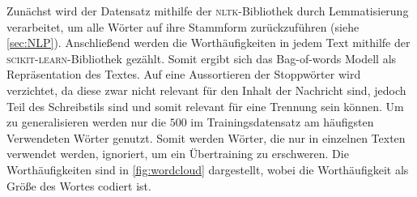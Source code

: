 Zunächst wird der Datensatz mithilfe der \textsc{nltk}-Bibliothek\cite{nltk} durch Lemmatisierung verarbeitet, um 
alle Wörter auf ihre Stammform zurückzuführen (siehe \autoref{sec:NLP}). 
Anschließend werden die Worthäufigkeiten in jedem Text mithilfe der \textsc{scikit-learn}-Bibliothek\cite{scikit-learn} 
gezählt. 
Somit ergibt sich das Bag-of-words Modell als Repräsentation des Textes.
Auf eine Aussortieren der Stoppwörter wird verzichtet, da diese zwar nicht relevant für den Inhalt der Nachricht sind,
jedoch Teil des Schreibstils sind und somit relevant für eine Trennung sein können.
Um zu generalisieren werden nur die $500$ im Trainingsdatensatz am häufigsten Verwendeten Wörter genutzt. 
Somit werden Wörter, die nur in einzelnen Texten verwendet werden, ignoriert, um ein Übertraining zu erschweren.
Die Worthäufigkeiten sind in \autoref{fig:wordcloud} dargestellt, wobei die Worthäufigkeit als Größe des Wortes codiert
ist.
